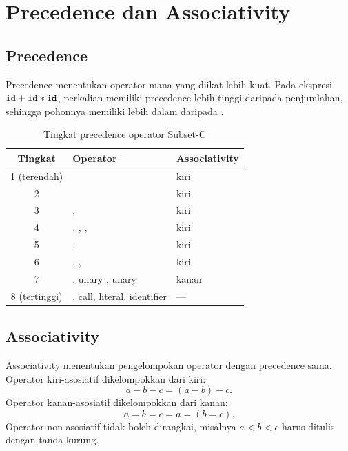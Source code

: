 \section{Precedence dan Associativity}
\label{sec:ch09-precedence}

\subsection{Precedence}

Precedence menentukan operator mana yang diikat lebih kuat. Pada
ekspresi \(\texttt{id} + \texttt{id} * \texttt{id}\), perkalian memiliki
precedence lebih tinggi daripada penjumlahan, sehingga pohonnya
memiliki \code{*} lebih dalam daripada \code{+}.

\begin{table}[H]
\centering
\caption{Tingkat precedence operator Subset-C}
\label{tab:ch09-precedence}
\begin{tabular}{@{}c l l@{}}
\toprule
\textbf{Tingkat} & \textbf{Operator} & \textbf{Associativity} \\
\midrule
1 (terendah) & \code{||} & kiri \\
2 & \code{\&\&} & kiri \\
3 & \code{==}, \code{!=} & kiri \\
4 & \code{<}, \code{<=}, \code{>}, \code{>=} & kiri \\
5 & \code{+}, \code{-} & kiri \\
6 & \code{*}, \code{/}, \code{\%} & kiri \\
7 & \code{!}, unary \code{-}, unary \code{+} & kanan \\
8 (tertinggi) & \code{()}, call, literal, identifier & --- \\
\bottomrule
\end{tabular}
\end{table}

\subsection{Associativity}

Associativity menentukan pengelompokan operator dengan precedence
sama. Operator kiri-asosiatif dikelompokkan dari kiri:
\[
a - b - c = (a - b) - c.
\]
Operator kanan-asosiatif dikelompokkan dari kanan:
\[
a = b = c = a = (b = c).
\]
Operator non-asosiatif tidak boleh dirangkai, misalnya
\(a < b < c\) harus ditulis dengan tanda kurung.

